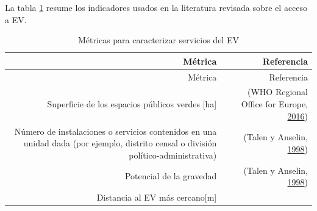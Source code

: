 \documentclass[12pt,a4paper,openany]{book}
\theoremstyle{definition}
\theoremstyle{definition}
\theoremstyle{definition}
\theoremstyle{remark}
\begin{document}
La tabla \ref{tab:ind-EV} resume los indicadores usados en la literatura
revisada sobre el acceso a EV.

\begin{longtable}[]{@{}rr@{}}
\caption{\label{tab:ind-EV} Métricas para caracterizar servicios del
EV}\tabularnewline
\toprule
\begin{minipage}[b]{0.57\columnwidth}\raggedleft\strut
Métrica\strut
\end{minipage} & \begin{minipage}[b]{0.31\columnwidth}\raggedleft\strut
Referencia\strut
\end{minipage}\tabularnewline
\midrule
\endfirsthead
\toprule
\begin{minipage}[b]{0.57\columnwidth}\raggedleft\strut
Métrica\strut
\end{minipage} & \begin{minipage}[b]{0.31\columnwidth}\raggedleft\strut
Referencia\strut
\end{minipage}\tabularnewline
\midrule
\endhead
\begin{minipage}[t]{0.57\columnwidth}\raggedleft\strut
Superficie de los espacios públicos verdes {[}ha{]}\strut
\end{minipage} & \begin{minipage}[t]{0.31\columnwidth}\raggedleft\strut
(WHO Regional Office for Europe,
\protect\hyperlink{ref-who2016urban}{2016})\strut
\end{minipage}\tabularnewline
\begin{minipage}[t]{0.57\columnwidth}\raggedleft\strut
Número de instalaciones o servicios contenidos en una unidad dada (por
ejemplo, distrito censal o división político-administrativa)\strut
\end{minipage} & \begin{minipage}[t]{0.31\columnwidth}\raggedleft\strut
(Talen y Anselin,
\protect\hyperlink{ref-talen_assessing_1998}{1998})\strut
\end{minipage}\tabularnewline
\begin{minipage}[t]{0.57\columnwidth}\raggedleft\strut
Potencial de la gravedad\strut
\end{minipage} & \begin{minipage}[t]{0.31\columnwidth}\raggedleft\strut
(Talen y Anselin,
\protect\hyperlink{ref-talen_assessing_1998}{1998})\strut
\end{minipage}\tabularnewline
\begin{minipage}[t]{0.57\columnwidth}\raggedleft\strut
Distancia al EV más cercano{[}m{]}\strut

\end{minipage}
\end{longtable}
\end{document}
